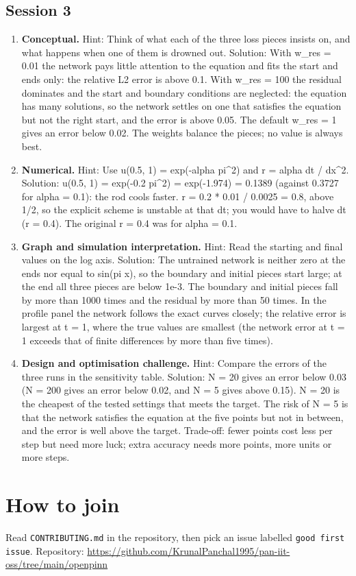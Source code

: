 \documentclass[11pt,a4paper]{article}
\begin{document}
\subsection*{Session 3}
\begin{enumerate}[nosep]
\item \textbf{Conceptual.} Hint: Think of what each of the three loss pieces insists on, and what happens when one of them is drowned out. Solution: With w\_res = 0.01 the network pays little attention to the equation and fits the start and ends only: the relative L2 error is above 0.1. With w\_res = 100 the residual dominates and the start and boundary conditions are neglected: the equation has many solutions, so the network settles on one that satisfies the equation but not the right start, and the error is above 0.05. The default w\_res = 1 gives an error below 0.02. The weights balance the pieces; no value is always best.
\item \textbf{Numerical.} Hint: Use u(0.5, 1) = exp(-alpha pi\textasciicircum{}2) and r = alpha dt / dx\textasciicircum{}2. Solution: u(0.5, 1) = exp(-0.2 pi\textasciicircum{}2) = exp(-1.974) = 0.1389 (against 0.3727 for alpha = 0.1): the rod cools faster. r = 0.2 * 0.01 / 0.0025 = 0.8, above 1/2, so the explicit scheme is unstable at that dt; you would have to halve dt (r = 0.4). The original r = 0.4 was for alpha = 0.1.
\item \textbf{Graph and simulation interpretation.} Hint: Read the starting and final values on the log axis. Solution: The untrained network is neither zero at the ends nor equal to sin(pi x), so the boundary and initial pieces start large; at the end all three pieces are below 1e-3. The boundary and initial pieces fall by more than 1000 times and the residual by more than 50 times. In the profile panel the network follows the exact curves closely; the relative error is largest at t = 1, where the true values are smallest (the network error at t = 1 exceeds that of finite differences by more than five times).
\item \textbf{Design and optimisation challenge.} Hint: Compare the errors of the three runs in the sensitivity table. Solution: N = 20 gives an error below 0.03 (N = 200 gives an error below 0.02, and N = 5 gives above 0.15). N = 20 is the cheapest of the tested settings that meets the target. The risk of N = 5 is that the network satisfies the equation at the five points but not in between, and the error is well above the target. Trade-off: fewer points cost less per step but need more luck; extra accuracy needs more points, more units or more steps.
\end{enumerate}

\section{How to join}
Read \texttt{CONTRIBUTING.md} in the repository, then pick an issue labelled \texttt{good first issue}. Repository: \url{https://github.com/KrunalPanchal1995/pan-iit-oss/tree/main/openpinn}
\end{document}
